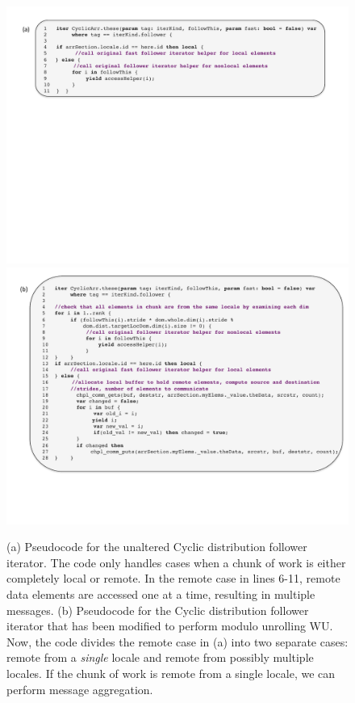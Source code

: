 \begin{figure}
\begin{center}
\includegraphics[width=\linewidth]{./Figures/cyclic_muwu_follower_before}
\includegraphics[width=\linewidth]{./Figures/cyclic_muwu_follower_after}
\renewcommand{\baselinestretch}{1}
\small\normalsize
\begin{quote}
\caption[The Chapel Cyclic distribution's follower iterator modified to perform modulo unrolling WU]{(a) Pseudocode for the unaltered Cyclic distribution follower iterator. The code only handles cases when a chunk of work is either completely local or remote. In the remote case in lines 6-11, remote data elements are accessed one at a time, resulting in multiple messages. (b) Pseudocode for the Cyclic distribution follower iterator that has been modified to perform modulo unrolling WU. Now, the code divides the remote case in (a) into two separate cases: remote from a \textit{single} locale and remote from possibly multiple locales. If the chunk of work is remote from a single locale, we can perform message aggregation.\label{cyclic_muwu_follower}}
\end{quote}
\end{center}
\end{figure}

